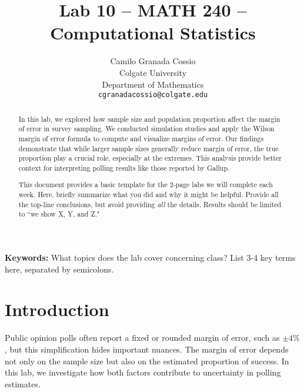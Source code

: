 \documentclass{article}\usepackage[]{graphicx}\usepackage[]{xcolor}
\begin{document}
\vspace{-1in}
\title{Lab 10 -- MATH 240 -- Computational Statistics}

\author{
  Camilo Granada Cossio \\
  Colgate University  \\
  Department of Mathematics  \\
  {\tt cgranadacossio@colgate.edu}
}

\date{}

\maketitle

\begin{multicols}{2}
\begin{abstract}

In this lab, we explored how sample size and population proportion affect the margin of error in survey sampling. We conducted simulation studies and apply the Wilson margin of error formula to compute and visualize margins of error. Our findings demonstrate that while larger sample sizes generally reduce margin of error, the true proportion play a crucial role, especially at the extremes. This analysis provide better context for interpreting polling results like those reported by Gallup.

This document provides a basic template for the 2-page labs we will complete each week. Here, briefly summarize what you did and why it might be helpful. Provide all the top-line conclusions, but avoid providing \emph{all} the details. Results should be limited to ``we show X, Y, and Z."
\end{abstract}

\noindent \textbf{Keywords:} What topics does the lab cover concerning class? List 3-4 key terms here, separated by semicolons.

\section{Introduction}

Public opinion polls often report a fixed or rounded margin of error, such as  $\pm 4\%$, but this simplification hides important nuances. The margin of error depends not only on the sample size but also on the estimated proportion of success. In this lab, we investigate how both factors contribute to uncertainty in polling estimates.


\end{multicols}
\end{document}
